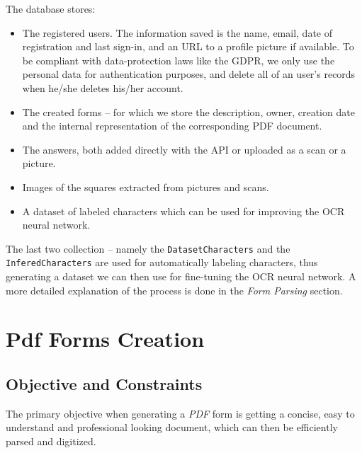 \documentclass[11pt, a4paper]{report}
\def\code#1{\texttt{#1}}
\begin{document}
The database stores:
\begin{itemize}
    \item The registered users. The information saved is the name, email, date of registration and last sign-in, and an URL to a profile picture if available. To be compliant with data-protection laws like the GDPR, we only use the personal data for authentication purposes, and delete all of an user's records when he/she deletes his/her account.
    \item The created forms -- for which we store the description, owner, creation date and the internal representation of the corresponding PDF document.
    \item The answers, both added directly with the API or uploaded as a scan or a picture.
    \item Images of the squares extracted from pictures and scans.
    \item A dataset of labeled characters which can be used for improving the OCR neural network.
\end{itemize}


The last two collection -- namely the \code{DatasetCharacters} and the \code{InferedCharacters} are used for automatically labeling characters, thus generating a dataset we can then use for fine-tuning the OCR neural network. A more detailed explanation of the process is done in the \textit{Form Parsing} section.


\chapter{Pdf Forms Creation}

\section{Objective and Constraints}

The primary objective when generating a \textit{PDF} form is getting a concise, easy to understand and professional looking document, which can then be efficiently parsed and digitized.
\end{document}
